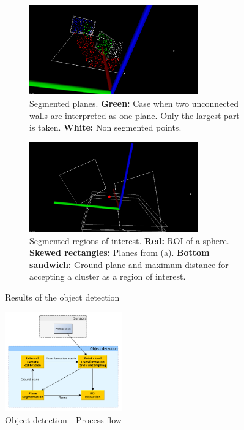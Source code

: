 \begin{figure}
\centering
\begin{subfigure}[b]{1.0\textwidth}
\centering
\includegraphics[width=0.8\textwidth]{figures/vision_planes.png}
\caption{Segmented planes. \textbf{Green:} Case when two unconnected walls are interpreted as one plane. Only the largest part is taken. \textbf{White:} Non segmented points.}
\label{fig:vision:seg_planes}
\vspace{10pt}
\end{subfigure}
\begin{subfigure}[b]{1.0\textwidth}
\includegraphics[width=0.8\textwidth]{figures/vision_roi_ball.png}
\centering
\caption{Segmented regions of interest. \textbf{Red:} ROI of a sphere. \textbf{Skewed rectangles:} Planes from (a). \textbf{Bottom sandwich:} Ground plane and maximum distance for accepting a cluster as a region of interest.}
\label{fig:vision:seg_rois}
\end{subfigure}
\caption{Results of the object detection}

\end{figure}

\begin{figure}
\begin{center}
\includegraphics[width=0.45\textwidth]{figures/arch_vision_obj_det.pdf}
\end{center}
\caption{Object detection - Process flow}
\label{fig:vision:obj_det}
\end{figure}
 
